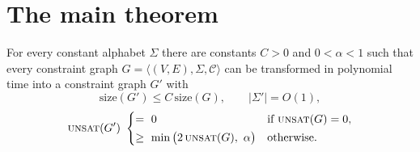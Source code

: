 \section{The main theorem}
\label{sec:main}

\begin{theorem}\label{thm:main6}
For every constant alphabet $\Sigma$ there are constants $C>0$ and $0<\alpha<1$ such that every constraint graph $G=\langle(V,E),\Sigma,\mathcal C\rangle$ can be transformed in polynomial time into a constraint graph $G'$ with
\[
  \mathrm{size}(G')\le C\,\mathrm{size}(G),\qquad |\Sigma'|=O(1),
\]
\[
  \textsc{unsat}(G')\ \begin{cases}=\ 0&\text{if }\textsc{unsat}(G)=0,\\[2pt]
  \ge\ \min\big(2\,\textsc{unsat}(G),\ \alpha\big)&\text{otherwise.}\end{cases}
\]
\end{theorem}

